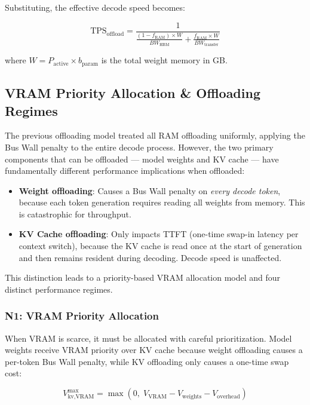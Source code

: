 \documentclass[11pt,a4paper]{article}
\theoremstyle{definition}
\begin{document}
Substituting, the effective decode speed becomes:

\begin{equation}\label{eq:offload_tps}
\text{TPS}_{\text{offload}} = \frac{1}{\frac{(1-f_{\text{RAM}}) \times W}{BW_{\text{HBM}}} + \frac{f_{\text{RAM}} \times W}{BW_{\text{transfer}}}}
\end{equation}

where $W = P_{\text{active}} \times b_{\text{param}}$ is the total weight memory in GB.

\subsection{VRAM Priority Allocation \& Offloading Regimes}

The previous offloading model treated all RAM offloading uniformly, applying the Bus Wall penalty to the entire decode process. However, the two primary components that can be offloaded --- model weights and KV cache --- have fundamentally different performance implications when offloaded:

\begin{itemize}
  \item \textbf{Weight offloading}: Causes a Bus Wall penalty on \emph{every decode token}, because each token generation requires reading all weights from memory. This is catastrophic for throughput.
  \item \textbf{KV Cache offloading}: Only impacts TTFT (one-time swap-in latency per context switch), because the KV cache is read once at the start of generation and then remains resident during decoding. Decode speed is unaffected.
\end{itemize}

This distinction leads to a priority-based VRAM allocation model and four distinct performance regimes.

\subsubsection{N1: VRAM Priority Allocation}

When VRAM is scarce, it must be allocated with careful prioritization. Model weights receive VRAM priority over KV cache because weight offloading causes a per-token Bus Wall penalty, while KV offloading only causes a one-time swap cost:

\begin{equation}\label{eq:kv_vram_max}
V_{\text{kv,VRAM}}^{\max} = \max(0, \; V_{\text{VRAM}} - V_{\text{weights}} - V_{\text{overhead}})
\end{equation}
\end{document}
